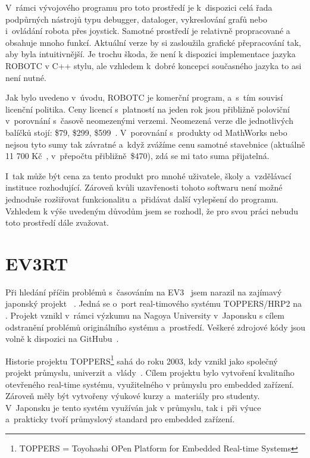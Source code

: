 V~rámci vývojového programu pro toto prostředí je k~dispozici celá řada podpůrných nástrojů typu debugger, dataloger, vykreslování grafů nebo i~ovládání robota přes joystick.
Samotné prostředí je relativně propracované a obsahuje mnoho funkcí. 
Aktuální verze by si zasloužila grafické přepracování tak, aby byla intuitivnější. 
Je trochu škoda, že není k dispozici implementace jazyka ROBOTC v C++ stylu, ale vzhledem k~dobré koncepci současného jazyka to asi není nutné. 

Jak bylo uvedeno v~úvodu, ROBOTC je komerční program, a~s~tím souvisí licenční politika. 
Ceny licencí s~platností na jeden rok jsou přibližně poloviční v~porovnání s~časově neomezenými verzemi.
Neomezená verze dle jednotlivých balíčků stojí: \$79, \$299, \$599~\cite{legoProgramingPlatform_ROBOTC-price}.  
V~porovnání s~produkty od MathWorks nebo \NI{} nejsou tyto sumy tak závratné a~když zvážíme cenu samotné stavebnice \legoEV{} (aktuálně 11 700 Kč~\cite{lego_eduxeEshop_CoreSet}, v~přepočtu přibližně~\$470), zdá se mi tato suma přijatelná.

I~tak může být cena za tento produkt pro mnohé uživatele, školy a~vzdělávací instituce rozhodující.
Zároveň kvůli uzavřenosti tohoto softwaru není možné jednoduše rozšiřovat funkcionalitu a~přidávat další vylepšení do programu. 
Vzhledem k výše uvedeným důvodům jsem se rozhodl, že pro svou práci nebudu toto prostředí dále zvažovat.	


\section{EV3RT}
\label{lego-EV3RT}

Při hledání příčin problémů s~časováním na EV3~\cite{legoMindstormsEV3_ev3dev-issue_constant-loop-time} jsem narazil na zajímavý japonský projekt \evRT{}~\cite{legoProgramingPlatform_EV3RT-git-web}.
Jedná se o~port real-timového systému TOPPERS/HRP2 na \legoEV{}.
Projekt \evRT{} vznikl v~rámci výzkumu na Nagoya University v~Japonsku s cílem odstranění problémů originálního \lego{} systému a~prostředí. 
Veškeré zdrojové kódy jsou volně k dispozici na GitHubu~\cite{legoProgramingPlatform_EV3RT-github}. 

Historie projektu TOPPERS\footnote{TOPPERS = Toyohashi OPen Platform for Embedded Real-time Systems} sahá do roku 2003, kdy vznikl jako společný projekt průmyslu, univerzit a~vlády~\cite{legoProgramingPlatform_TOPPERS}. 
Cílem projektu bylo vytvoření kvalitního otevřeného real-time systému, využitelného v průmyslu pro embedded zařízení. 
Zároveň měly být vytvořeny výukové kurzy a~materiály pro studenty.
V~Japonsku je tento systém využíván jak v průmyslu, tak i~při výuce a~prakticky tvoří průmyslový standard pro embedded zařízení. 

